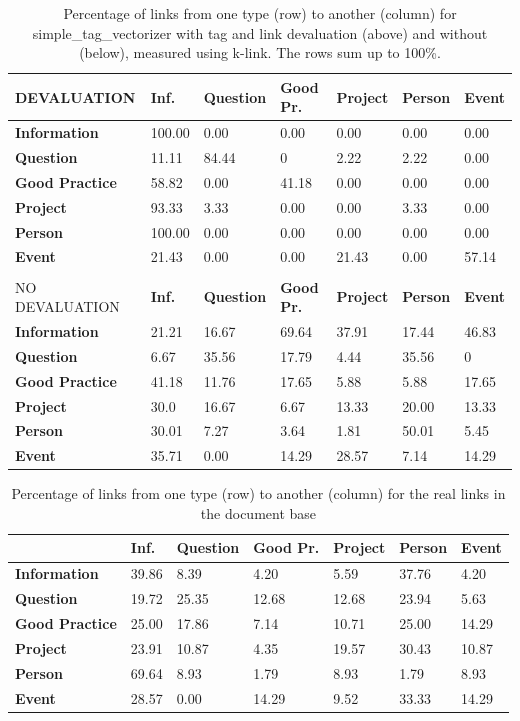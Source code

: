 \begin{table}
\begin{tabular}{| l | l | l | l | l | l | l | }
\hline
DEVALUATION & {\bf Inf. }& {\bf Question }& {\bf Good Pr.} & {\bf Project }&{\bf Person }& {\bf Event}  \\
\hline
{\bf Information} & 100.00 &  0.00 &  0.00 &  0.00  & 0.00 & 0.00 \\
{\bf Question} & 11.11 &  84.44  & 0 & 2.22  & 2.22 & 0.00 \\
{\bf Good Practice} & 58.82 &  0.00  &  41.18  &  0.00  & 0.00 & 0.00 \\
{\bf Project }& 93.33 &  3.33  &  0.00  & 0.00 & 3.33 & 0.00 \\
{\bf Person} &  100.00 &  0.00 &  0.00 &  0.00  & 0.00 & 0.00 \\
{\bf Event }& 21.43 &  0.00  &  0.00 &  21.43  & 0.00 & 57.14 \\
\hline
\\
\hline
NO DEVALUATION & {\bf Inf. }& {\bf Question }& {\bf Good Pr.} & {\bf Project }&{\bf Person }& {\bf Event} \\
\hline
{\bf Information} &  21.21 & 16.67 & 69.64 & 37.91 & 17.44 & 46.83 \\
{\bf Question} & 6.67 & 35.56 &17.79 & 4.44 & 35.56 & 0 \\
{\bf Good Practice} & 41.18 & 11.76 & 17.65 & 5.88 & 5.88 & 17.65 \\
{\bf Project } & 30.0 & 16.67 & 6.67 & 13.33 & 20.00 & 13.33 \\
{\bf Person} & 30.01 & 7.27 & 3.64 & 1.81 & 50.01 & 5.45 \\
{\bf Event }& 35.71 & 0.00 & 14.29 & 28.57 & 7.14 & 14.29 \\
\hline
\end{tabular}

\caption{Percentage of links from one type (row) to another (column) for simple\_tag\_vectorizer with tag and link devaluation (above) and without (below), measured using k-link. The rows sum up to 100\%.}
\label{bayes_table2}
\end{table}

\begin{table}
\begin{tabular}{| l | l | l | l | l | l | l | }
\hline
 & {\bf Inf. }& {\bf Question }& {\bf Good Pr.} & {\bf Project }&{\bf Person }& {\bf Event} \\
\hline
{\bf Information} &  39.86 & 8.39 &4.20 &5.59 &37.76 &4.20\\
{\bf Question} & 19.72 &25.35 &12.68 &12.68 &23.94 &5.63\\
{\bf Good Practice} & 25.00 & 17.86 & 7.14 & 10.71 & 25.00 & 14.29 \\
{\bf Project } & 23.91 & 10.87 & 4.35 & 19.57 & 30.43 & 10.87 \\
{\bf Person} & 69.64 & 8.93 & 1.79 & 8.93 & 1.79 & 8.93 \\
{\bf Event }& 28.57 & 0.00 & 14.29 & 9.52 & 33.33 & 14.29\\
\hline
\end{tabular}
\caption{Percentage of links from one type (row) to another (column) for the real links in the document base}
\label{bayes_table3}
\end{table}

